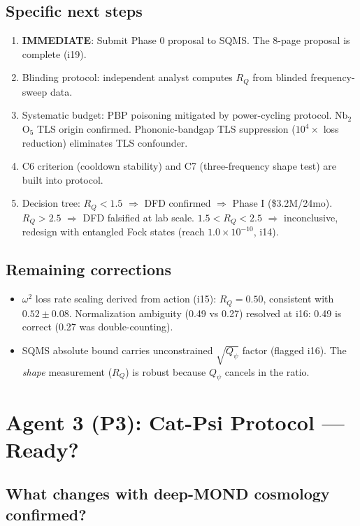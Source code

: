 \documentclass[11pt]{article}
\begin{document}
\subsection{Specific next steps}
\begin{enumerate}
\item \textbf{IMMEDIATE}: Submit Phase 0 proposal to SQMS. The 8-page proposal is complete (i19).
\item Blinding protocol: independent analyst computes $R_Q$ from blinded frequency-sweep data.
\item Systematic budget: PBP poisoning mitigated by power-cycling protocol. Nb$_2$O$_5$ TLS
origin confirmed. Phononic-bandgap TLS suppression ($10^4\times$ loss reduction) eliminates
TLS confounder.
\item C6 criterion (cooldown stability) and C7 (three-frequency shape test) are built into protocol.
\item Decision tree: $R_Q < 1.5$ $\Rightarrow$ DFD confirmed $\Rightarrow$ Phase I (\$3.2M/24mo).
$R_Q > 2.5$ $\Rightarrow$ DFD falsified at lab scale. $1.5 < R_Q < 2.5$ $\Rightarrow$ inconclusive,
redesign with entangled Fock states (reach $1.0 \times 10^{-10}$, i14).
\end{enumerate}

\subsection{Remaining corrections}
\begin{itemize}
\item $\omega^2$ loss rate scaling derived from action (i15): $R_Q = 0.50$, consistent with
$0.52 \pm 0.08$. Normalization ambiguity (0.49 vs 0.27) resolved at i16: 0.49 is correct
(0.27 was double-counting).
\item SQMS absolute bound carries unconstrained $\sqrt{Q_\psi}$ factor (flagged i16). The
\emph{shape} measurement ($R_Q$) is robust because $Q_\psi$ cancels in the ratio.
\end{itemize}

\newpage
\section{Agent 3 (P3): Cat-Psi Protocol --- Ready?}
\label{sec:agent3}

\subsection{What changes with deep-MOND cosmology confirmed?}
\end{document}
